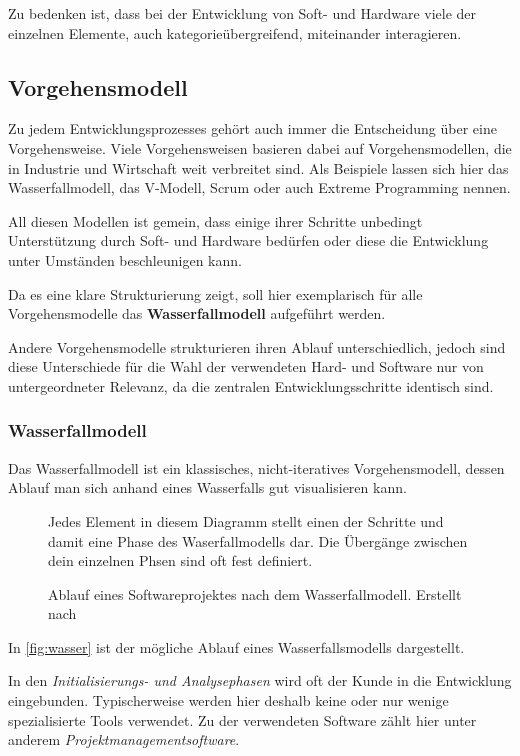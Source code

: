 Zu bedenken ist, dass bei der Entwicklung von Soft- und Hardware viele der
einzelnen Elemente, auch kategorieübergreifend, miteinander interagieren. 
\subsection{Vorgehensmodell}
Zu jedem Entwicklungsprozesses gehört auch immer die Entscheidung über eine
Vorgehensweise. Viele Vorgehensweisen basieren dabei auf Vorgehensmodellen,
die in Industrie und Wirtschaft weit verbreitet sind. Als Beispiele lassen sich
hier das Wasserfallmodell, das V-Modell, Scrum oder auch Extreme Programming
nennen.

All diesen Modellen ist gemein, dass einige ihrer Schritte
unbedingt Unterstützung durch Soft- und Hardware bedürfen oder
diese die Entwicklung unter Umständen beschleunigen kann.

Da es eine klare Strukturierung zeigt, soll hier exemplarisch für alle
Vorgehensmodelle das \textbf{Wasserfallmodell} aufgeführt werden.

Andere Vorgehensmodelle strukturieren ihren Ablauf unterschiedlich, jedoch sind
diese Unterschiede für die Wahl der verwendeten Hard- und Software nur von
untergeordneter Relevanz, da die zentralen Entwicklungsschritte
identisch sind.

\subsubsection*{Wasserfallmodell}
Das Wasserfallmodell ist ein klassisches, nicht-iteratives Vorgehensmodell,
dessen Ablauf man sich anhand eines Wasserfalls gut visualisieren kann. 

\begin{figure}[!h]
\centering
\def\svgwidth{\columnwidth}

\caption{Ablauf eines Softwareprojektes nach dem Wasserfallmodell. Erstellt nach
\cite{WP01}}{Jedes Element in diesem Diagramm stellt einen der Schritte und
damit eine Phase des Waserfallmodells dar. Die Übergänge zwischen dein
einzelnen Phsen sind oft fest definiert.}
\label{fig:wasser}
\end{figure}

In \autoref{fig:wasser} ist der mögliche Ablauf eines Wasserfallsmodells
dargestellt.

In den \emph{Initialisierungs- und Analysephasen} wird oft der Kunde in die
Entwicklung eingebunden. Typischerweise werden hier deshalb keine oder nur
wenige spezialisierte Tools verwendet. Zu der verwendeten Software zählt hier
unter anderem \emph{Projektmanagementsoftware}.

